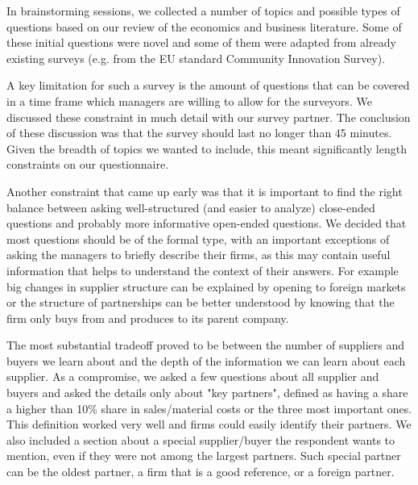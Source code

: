 \usepackage{}\documentclass[final, dvipsnames, authoryear,12pt]{elsarticle}
\begin{document}
In brainstorming sessions, we collected a number of topics and possible types of questions based on our review of the economics and business literature. Some of these initial questions were novel and some of them were adapted from already existing surveys (e.g. from the EU standard Community Innovation Survey). 

A key limitation for such a survey is the amount of questions that can be covered in a time frame which managers are willing to allow for the surveyors. We discussed these constraint in much detail with our survey partner. The conclusion of these discussion was that the survey should last no longer than 45 minutes. Given the breadth of topics we wanted to include, this meant significantly length constraints on our questionnaire. 

Another constraint that came up early was that it is important to find the right balance between asking well-structured (and easier to analyze) close-ended questions and probably more informative open-ended questions. We decided that most questions should be of the formal type,  with an important exceptions of asking the managers to briefly describe their firms, as this may contain useful information that helps to understand the context of their answers. For example big changes in supplier structure can be explained by opening to foreign markets or the structure of partnerships can be better understood by knowing that the firm only buys from and produces to its parent company.



The most substantial tradeoff proved to be between the number of suppliers and buyers we learn about and the depth of the information we can learn about each supplier. As a compromise, we asked a few questions about all supplier and buyers and asked the details only about "key partners", defined as having a share a higher than 10\% share in sales/material costs or the three most important ones. This definition worked very well and firms could easily identify their partners. We also included a section about a special supplier/buyer the respondent wants to mention, even if they were not among the largest partners. Such special partner can be the oldest partner, a firm that is a good reference, or a foreign partner.
\end{document}
